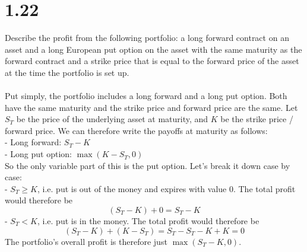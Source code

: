 \documentclass{article}
\begin{document}
{\Large 

\section*{1.22}

Describe the profit from the following portfolio: a long forward contract on an asset and a long European put option on the asset with the same maturity as the forward contract and a strike price that is equal to the forward price of the asset at the time the portfolio is set up. \\ \\
Put simply, the portfolio includes a long forward and a long put option. Both have the same maturity and the strike price and forward price are the same. Let \(S_T\) be the price of the underlying asset at maturity, and \(K\) be the strike price / forward price. We can therefore write the payoffs at maturity as follows: \\
- Long forward: \(S_T - K\) \\ 
- Long put option: \(\max(K - S_T, 0)\) \\
So the only variable part of this is the put option. Let's break it down case by case: \\
- \(S_T \geq K\), i.e. put is out of the money and expires with value 0. The total profit would therefore be 
\[
  (S_T - K) + 0 = S_T - K
\]
- \(S_T < K\), i.e. put is in the money. The total profit would therefore be 
\[
  (S_T - K) + (K - S_T) = S_T - S_T - K + K = 0
\] 
The portfolio's overall profit is therefore just \textbf{\(\max(S_T - K, 0)\)}.

}
\end{document}
